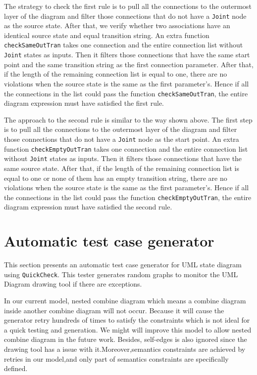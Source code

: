 The strategy to check the first rule is to pull all the connections to the outermost layer of the diagram and filter those connections that do not have a \verb|Joint| node as the source state.
After that, we verify whether two associations have an identical source state and equal transition string.
An extra function \verb|checkSameOutTran| takes one connection and the entire connection list without \verb|Joint| states as inputs. 
Then it filters those connections that have the same start point and the same transition string as the first connection parameter. 
After that, if the length of the remaining connection list is equal to one, there are no violations when the source state is the same as the first parameter's.
Hence if all the connections in the list could pass the function \verb|checkSameOutTran|, the entire diagram expression must have satisfied the first rule.

The approach to the second rule is similar to the way shown above. 
The first step is to pull all the connections to the outermost layer of the diagram and filter those connections that do not have a \verb|Joint| node as the start point.
An extra function \verb|checkEmptyOutTran| takes one connection and the entire connection list without \verb|Joint| states as inputs. 
Then it filters those connections that have the same source state.
After that, if the length of the remaining connection list is equal to one or none of them has an empty transition string, there are no violations when the source state is the same as the first parameter's.
Hence if all the connections in the list could pass the function \verb|checkEmptyOutTran|, the entire diagram expression must have satisfied the second rule.






\section{Automatic test case generator }
\label{sec:generator}
This section presents an automatic test case generator for  UML state diagram using \verb|QuickCheck|.
This tester generates random graphs to monitor the UML Diagram drawing tool if there are exceptions.

In our current model, nested combine diagram which means a combine diagram inside another combine diagram will not occur.
Because it will cause the generator retry hundreds of times to satisfy the constraints which is not ideal for a quick testing and generation.
We might will improve this model to allow nested combine diagram in the future work.
Besides, self-edges is also ignored since the drawing tool has a issue with it.Moreover,semantics constraints are achieved by retries in our model,and only part of semantics constraints are specifically defined.

